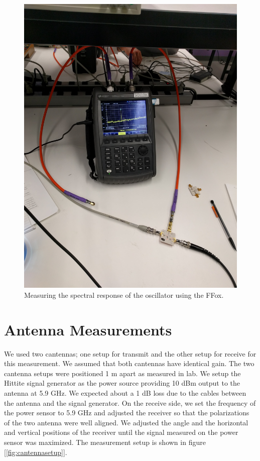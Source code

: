\documentclass{article}
\begin{document}
\begin{figure}[!htbp]
    \centering
    \includegraphics[scale=0.04]{osc_meas_setup.jpg}
    \caption{Measuring the spectral response of the oscillator using the FFox.}
    \label{fig:oscmeas}
\end{figure}

\section*{Antenna Measurements}\label{sec:cantmeas}

We used two cantennas; one setup for transmit and the other setup for receive for this measurement. We assumed that both cantennas have identical gain. The two cantenna setups were positioned 1 m apart as measured in lab. We setup the Hittite signal generator as the power source providing 10 dBm output to the antenna at 5.9 GHz. We expected about a 1 dB loss due to the cables between the antenna and the signal generator. On the receive side, we set the frequency of the power sensor to 5.9 GHz and adjusted the receiver so that the polarizations of the two antenna were well aligned. We adjusted the angle and the horizontal and vertical positions of the receiver until the signal measured on the power sensor was maximized. The measurement setup is shown in figure [\ref{fig:cantennasetup}].
\end{document}
